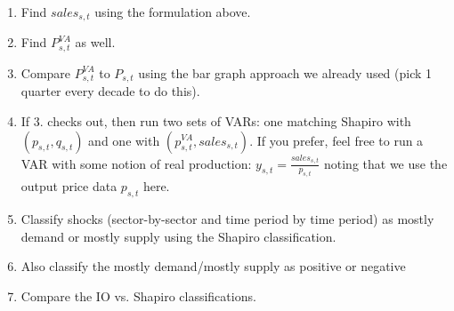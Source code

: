 \documentclass[12pt,english]{article}
\begin{document}
\begin{enumerate}
	\item Find $sales_{s,t}$ using the formulation above.
	\item Find $P_{s,t}^{VA}$ as well.
	\item Compare $P_{s,t}^{VA}$ to $P_{s,t}$ using the bar graph approach we already used (pick 1 quarter every decade to do this).
	\item If 3. checks out, then run two sets of VARs: one matching Shapiro with $(p_{s,t},q_{s,t})$ and one with $(p_{s,t}^{VA},sales_{s,t})$. If you prefer, feel free to run a VAR with some notion of real production: $y_{s,t}=\frac{sales_{s,t}}{p_{s,t}}$ noting that we use the output price data $p_{s,t}$ here.
	\item Classify shocks (sector-by-sector and time period by time period) as mostly demand or mostly supply using the Shapiro classification.
	\item Also classify the mostly demand/mostly supply as positive or negative
	\item Compare the IO vs. Shapiro classifications.
\end{enumerate}
\end{document}

